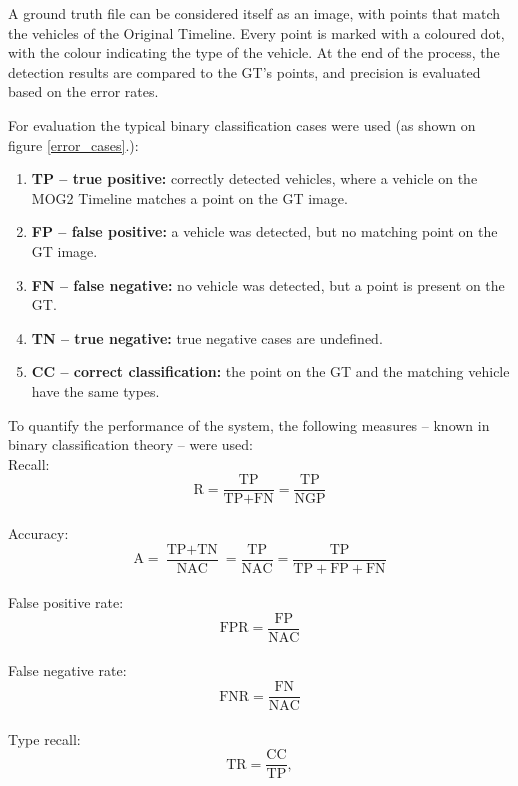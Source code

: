 A ground truth file can be considered itself as an image, with points that match the vehicles of the Original Timeline.
Every point is marked with a coloured dot, with the colour indicating the type of the vehicle.
At the end of the process, the detection results are compared to the GT's  points, and precision is evaluated based on the error rates.

\begin{figure}[!h]
	\centering
	
	\caption{ \label{fig:error_cases}}
\end{figure}

For evaluation the typical binary classification cases were used (as shown on figure \ref{error_cases}.):
\begin{enumerate}
\item \textbf{TP -- true positive:} correctly detected vehicles, where a vehicle on the MOG2 Timeline matches a point on the GT image.
\item \textbf{FP -- false positive:} a vehicle was detected, but no matching point on the GT image.
\item \textbf{FN -- false negative:} no vehicle was detected, but a point is present on the GT. 
\item \textbf{TN -- true negative:} true negative cases are undefined.
\item  \textbf{CC -- correct classification:} the point on the GT and the matching vehicle have the same types.
\end{enumerate}

To quantify the performance of the system, the following measures -- known in binary classification theory -- were used:
\\[5pt]
\noindent Recall:
\begin{displaymath}
\text{R} = \frac{\text{TP}}{\text{TP}+\text{FN}} = \frac{\text{TP}}{\text{NGP}}
\end{displaymath}
\\[5pt]
\noindent Accuracy:
\begin{displaymath}
\text{A} = \frac{\text{TP}+\text{TN}}{\text{NAC}} = \frac{\text{TP}}{\text{NAC}} = \frac{\text{TP}}{\text{TP}+\text{FP}+\text{FN}}
\end{displaymath}
\\[5pt]
\noindent False positive rate:
\begin{displaymath}
\text{FPR} = \frac{\text{FP}}{\text{NAC}}
\end{displaymath}
\\[5pt]
\noindent False negative rate:
\begin{displaymath}
\text{FNR} = \frac{\text{FN}}{\text{NAC}}
\end{displaymath}
\\[5pt]
\noindent Type recall:
\begin{displaymath}
\text{TR} = \frac{\text{CC}}{\text{TP}},
\end{displaymath}

